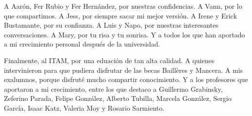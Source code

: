 A Aar\'on, Fer Rubio y Fer Hern\'andez, por nuestras confidencias. A Vann, por lo que compartimos. A Jess, por siempre sacar mi mejor versi\'on. A Irene y Erick Bustamante, por su confianza. A Luis y Napo, por nuestras interesantes conversaciones. A Mary, por tu risa y tu sonrisa. Y a todos los que han aportado a mi crecimiento personal despu\'es de la universidad. 

Finalmente, al ITAM, por una eduaci\'on de tan alta calidad. A quienes intervinieron para que pudiera disfrutar de las becas Baillères y Mancera. A mis exalumnos, porque disfrut\'e mucho compartir conocimiento. Y a los profesores que aportaron a mi crecimiento, entre los que destaco a Guillermo Grabinsky, Zeferino Parada, Felipe Gonz\'alez, Alberto Tubilla, Marcela Gonz\'alez, Sergio Garc\'ia, Isaac Katz, Valeria Moy y Rosario Sarmiento.